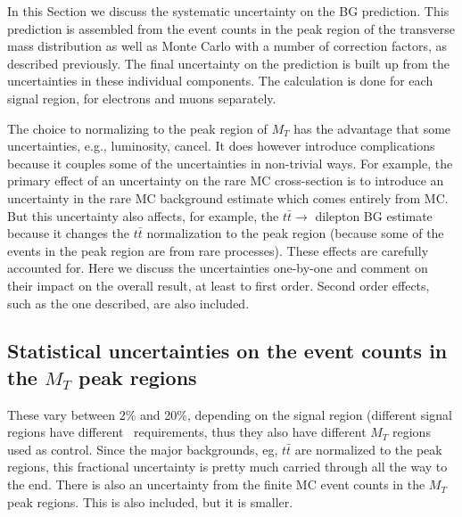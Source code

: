 
In this Section we discuss the systematic uncertainty on the BG
prediction.  This prediction is assembled from the event
counts in the peak region of the transverse mass distribution as
well as Monte Carlo 
with a number of correction factors, as described previously.
The
final uncertainty on the prediction is built up from the uncertainties in these
individual 
components. 
The calculation is done for each signal
region,
for electrons and muons separately.

The choice to normalizing to the peak region of $M_T$ has the
advantage that some uncertainties, e.g., luminosity, cancel.
It does however introduce complications because it couples
some of the uncertainties in non-trivial ways.  For example, 
the primary effect of an uncertainty on the rare MC cross-section
is to introduce an uncertainty in the rare MC background estimate
which comes entirely from MC.   But this uncertainty also affects,
for example,
the $t\bar{t} \to$ dilepton BG estimate because it changes the 
$t\bar{t}$ normalization to the peak region (because some of the 
events in the peak region are from rare processes).  These effects
are carefully accounted for.  
Here we discuss the uncertainties one-by-one and comment 
on their impact on the overall result, at least to first order.
Second order effects, such as the one described, are also included.

\subsection{Statistical uncertainties on the event counts in the $M_T$
peak regions}
These vary between 2\% and 20\%, depending on the signal region
(different
signal regions have different \met\ requirements, thus they also have
different $M_T$ regions used as control.
Since 
the major backgrounds, eg, $t\bar{t}$ are normalized to the peak regions, this 
fractional uncertainty is pretty much carried through all the way to
the end.  There is also an uncertainty from the finite MC event counts
in the $M_T$ peak regions.  This is also included, but it is smaller.

